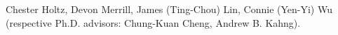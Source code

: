 
\begin{DoxyItemize}
\item Chester Holtz, Devon Merrill, James (Ting-\/\+Chou) Lin, Connie (Yen-\/\+Yi) Wu (respective Ph.\+D. advisors\+: Chung-\/\+Kuan Cheng, Andrew B. Kahng). 
\end{DoxyItemize}